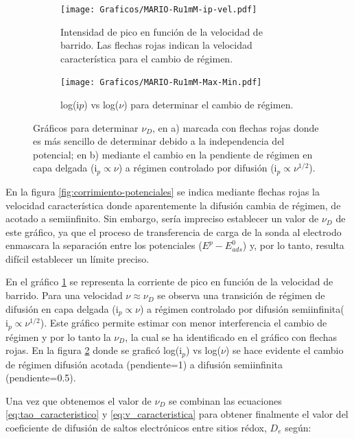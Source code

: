          	 \begin{figure}[ht!]
			 	 \begin{subfigure}[t]{0.5\textwidth}
			 	 \texttt{[image: Graficos/MARIO-Ru1mM-ip-vel.pdf]}
				  \caption{Intensidad de pico  en función de la velocidad de barrido. Las flechas rojas indican la velocidad característica para el cambio de régimen.}
			 	 \label{fig:ip-vel}
		  	  	 \end{subfigure}	
			 	 \begin{subfigure}[t]{0.5\textwidth}
			  	 \texttt{[image: Graficos/MARIO-Ru1mM-Max-Min.pdf]}
			  	 \caption{log(i$p$) vs log($\nu$) para determinar el cambio de régimen.}
			 	 \label{fig:logj-logv}
		  		 \end{subfigure}
				  \caption[Cálculo de velocidad de barrido característica]{Gráficos para determinar $\nu_{\scriptscriptstyle{D}}$, en a) marcada con flechas rojas donde es más sencillo de determinar debido a la independencia del potencial; en b) mediante el cambio en la pendiente de  régimen en capa delgada ($\text{i}_{p} \propto \nu$) a régimen controlado por difusión ($\text{i}_{p} \propto \nu^{1/2}$).}
			 	 \label{fig:ip-vel2}
			 	 \end{figure}
		   
		 En la figura \ref{fig:corrimiento-potenciales} se indica mediante flechas rojas la velocidad característica donde aparentemente la difusión cambia de régimen, de acotado a semiinfinito. Sin embargo, sería impreciso establecer un valor de $\nu_{\scriptscriptstyle{D}}$ de este gráfico, ya que el proceso de transferencia de carga de la sonda al electrodo enmascara la separación entre los potenciales ($E^p-E^0_{ads}$) y, por lo tanto, resulta difícil establecer un límite preciso.
		   	 	 
         En el gráfico \ref{fig:ip-vel} se representa la corriente de pico en función de la velocidad de barrido. Para una velocidad $\nu \approx \nu_{\scriptscriptstyle{D}}$ se observa una transición de régimen de difusión en capa delgada ($\text{i}_{p} \propto \nu$) a régimen controlado por difusión semiinfinita($\text{i}_{p} \propto \nu^{1/2}$). Este gráfico permite estimar con menor interferencia el cambio de régimen y por lo tanto la $\nu_{\scriptscriptstyle{D}}$, la cual se ha identificado en el gráfico con flechas rojas. En la figura \ref{fig:logj-logv} donde se graficó log({i$_p$}) vs log({$\nu$}) se hace evidente el cambio de régimen difusión acotada (pendiente=1) a difusión semiinfinita (pendiente=0.5).

		 Una vez que obtenemos el valor de  $\nu_{\scriptscriptstyle{D}}$ se combinan las ecuaciones \ref{eq:tao_caracteristico} y \ref{eq:v_caracteristica} para obtener finalmente el valor del coeficiente de difusión de saltos electrónicos entre sitios rédox,  $D_e$ según: 

